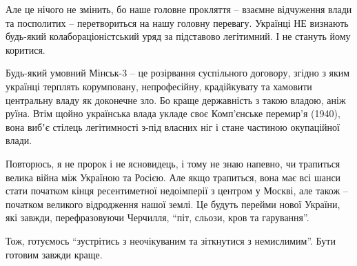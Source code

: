Але це нічого не змінить, бо наше головне прокляття – взаємне відчуження влади
та посполитих – перетвориться на нашу головну перевагу. Українці НЕ визнають
будь-який колабораціоністський уряд за підставово легітимний. І не стануть йому
коритися. 

Будь-який умовний Мінськ-3 – це розірвання суспільного договору, згідно з яким
українці терплять корумповану, непрофесійну, крадійкувату та хамовити
центральну владу як доконечне зло. Бо краще державність з такою владою, аніж
руїна. Втім щойно українська влада укладе своє Комп'єнське перемир'я (1940),
вона вибʼє стілець легітимності з-під власних ніг і стане частиною окупаційної
влади.

Повторюсь, я не пророк і не ясновидець, і тому не знаю напевно, чи трапиться
велика війна між Україною та Росією. Але якщо трапиться, вона має всі шанси
стати початком кінця ресентиметної недоімперії з центром у Москві, але також –
початком великого відродження нашої землі. Це будуть перейми нової України, які
завжди, перефразовуючи Черчилля, \enquote{піт, сльози, кров та гарування}.  

Тож, готуємось \enquote{зустрітись з неочікуваним та зіткнутися з немислимим}. Бути
готовим завжди краще.
